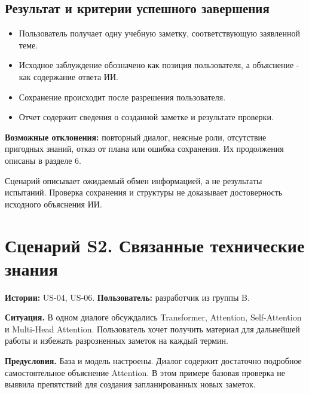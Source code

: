 \subsection{Результат и критерии успешного завершения}

\begin{itemize}
\item Пользователь получает одну учебную заметку, соответствующую заявленной теме.
\item Исходное заблуждение обозначено как позиция пользователя, а объяснение - как содержание ответа ИИ.
\item Сохранение происходит после разрешения пользователя.
\item Отчет содержит сведения о созданной заметке и результате проверки.

\end{itemize}
\textbf{Возможные отклонения:} повторный диалог, неясные роли, отсутствие пригодных знаний, отказ от плана или ошибка сохранения. Их продолжения описаны в разделе 6.


Сценарий описывает ожидаемый обмен информацией, а не результаты испытаний. Проверка сохранения и структуры не доказывает достоверность исходного объяснения ИИ.



\clearpage
\section{Сценарий S2. Связанные технические знания}

\textbf{Истории:} US-04, US-06. \textbf{Пользователь:} разработчик из группы B.


\textbf{Ситуация.} В одном диалоге обсуждались Transformer, Attention, Self-Attention и Multi-Head Attention. Пользователь хочет получить материал для дальнейшей работы и избежать разрозненных заметок на каждый термин.


\textbf{Предусловия.} База и модель настроены. Диалог содержит достаточно подробное самостоятельное объяснение Attention. В этом примере базовая проверка не выявила препятствий для создания запланированных новых заметок.


